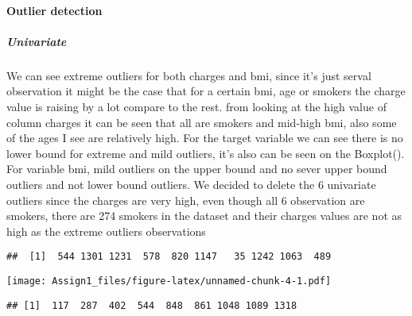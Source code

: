 \documentclass[
]{article}
\newenvironment{Shaded}{\begin{snugshade}}{\end{snugshade}}
\newcommand{\AttributeTok}[1]{\textcolor[rgb]{0.77,0.63,0.00}{#1}}
\newcommand{\DecValTok}[1]{\textcolor[rgb]{0.00,0.00,0.81}{#1}}
\newcommand{\FunctionTok}[1]{\textcolor[rgb]{0.00,0.00,0.00}{#1}}
\newcommand{\NormalTok}[1]{#1}
\newcommand{\SpecialCharTok}[1]{\textcolor[rgb]{0.00,0.00,0.00}{#1}}
\begin{document}
\hypertarget{outlier-detection}{%
\paragraph{Outlier detection}\label{outlier-detection}}

\hypertarget{univariate}{%
\subparagraph{Univariate}\label{univariate}}

We can see extreme outliers for both charges and bmi, since it's just
serval observation it might be the case that for a certain bmi, age or
smokers the charge value is raising by a lot compare to the rest. from
looking at the high value of column charges it can be seen that all are
smokers and mid-high bmi, also some of the ages I see are relatively
high. For the target variable we can see there is no lower bound for
extreme and mild outliers, it's also can be seen on the Boxplot(). For
variable bmi, mild outliers on the upper bound and no sever upper bound
outliers and not lower bound outliers. We decided to delete the 6
univariate outliers since the charges are very high, even though all 6
observation are smokers, there are 274 smokers in the dataset and their
charges values are not as high as the extreme outliers observations

\begin{Shaded}
\end{Shaded}

\begin{verbatim}
##  [1]  544 1301 1231  578  820 1147   35 1242 1063  489
\end{verbatim}

\begin{Shaded}
\end{Shaded}

\texttt{[image: Assign1\_files/figure-latex/unnamed-chunk-4-1.pdf]}

\begin{verbatim}
## [1]  117  287  402  544  848  861 1048 1089 1318
\end{verbatim}
\end{document}
